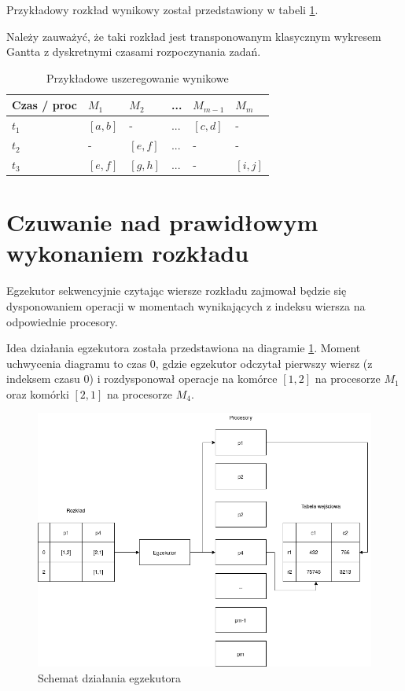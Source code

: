 \documentclass[brudnopis]{xmgr}
\begin{document}
Przykładowy rozkład wynikowy został przedstawiony w tabeli \ref{tab:example-sched-out}.
\medskip

Należy zauważyć, że taki rozkład jest transponowanym klasycznym wykresem Gantta z dyskretnymi czasami rozpoczynania zadań.

\begin{table}[!tbh]
\begin{tabular}{|l|l|l|l|l|l|} \hline
Czas / proc & $M_1$     & $M_2$     & ...   & $M_{m-1}$ & $M_{m}$ \\ \hline
$t_1$       & $[a,b]$   & -         & ...   & $[c,d]$   & - \\ \hline
$t_2$       & -         & $[e,f]$   & ...   & -         & - \\ \hline
$t_3$       & $[e,f]$   & $[g,h]$   & ...   & -         & $[i,j]$\\ \hline
\end{tabular}
\caption{Przykładowe uszeregowanie wynikowe\label{tab:example-sched-out}}
\end{table}


\section{Czuwanie nad prawidłowym wykonaniem rozkładu}

Egzekutor sekwencyjnie czytając wiersze rozkładu zajmował będzie się dysponowaniem operacji w momentach wynikających z indeksu wiersza na odpowiednie procesory.
\medskip

Idea działania egzekutora została przedstawiona na diagramie \ref{diag:executor}. Moment uchwycenia diagramu 
to czas 0, gdzie egzekutor odczytał pierwszy wiersz (z indeksem czasu 0) i rozdysponował operacje na komórce $[1,2]$ na procesorze $M_1$ oraz komórki $[2,1]$ na procesorze $M_4$.
\medskip

\begin{figure}[!tbh]
\centering
\includegraphics[width=.8\hsize]{fig/executor.png}
\caption{Schemat działania egzekutora\label{diag:executor}}
\end{figure}
\medskip
\end{document}
